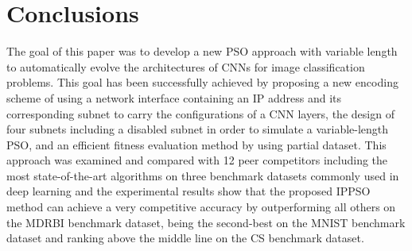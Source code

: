 \documentclass[conference]{IEEEtran}
\begin{document}
%






\section{Conclusions}\label{sec:Conclusion}

The goal of this paper was to develop a new PSO approach with variable length to automatically evolve the architectures of CNNs for image classification problems. This goal has been successfully achieved by proposing a new encoding scheme of using a network interface containing an IP address and its corresponding subnet to carry the configurations of a CNN layers, the design of four subnets including a disabled subnet in order to simulate a variable-length PSO, and an efficient fitness evaluation method by using partial dataset. This approach was examined and compared with 12 peer competitors including the most state-of-the-art algorithms on three benchmark datasets commonly used in deep learning and the experimental results show that the proposed IPPSO method can achieve a very competitive accuracy by outperforming all others on the MDRBI benchmark dataset, being the second-best on the MNIST benchmark dataset and ranking above the middle line on the CS benchmark dataset. 
\end{document}
